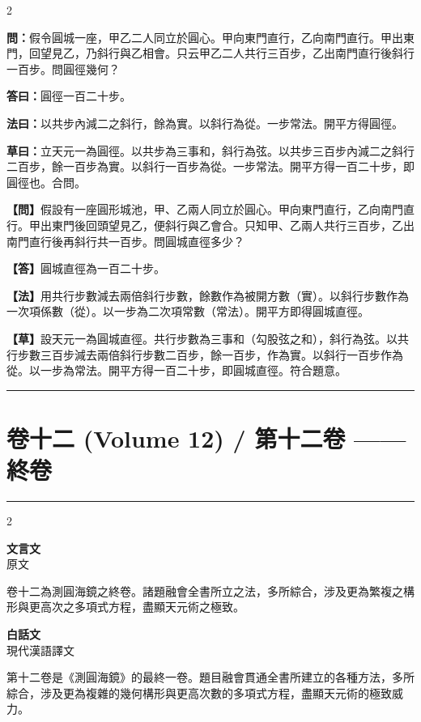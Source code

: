 \documentclass[11pt,a4paper]{article}
\newcommand{\longline}{\noindent\rule{\textwidth}{0.4pt}}
\newcommand{\wenC}[1]{\par\noindent\textbf{\textcolor{probcolor}{問：}}{#1}\par}
\newcommand{\daC}[1]{\par\noindent\textbf{\textcolor{anscolor}{答曰：}}{#1}\par}
\newcommand{\fayueC}[1]{\par\noindent\textbf{\textcolor{methodcolor}{法曰：}}{#1}\par}
\newcommand{\caoyueC}[1]{\par\noindent\textbf{草曰：}{#1}\par}
\newcommand{\wenM}[1]{\par\noindent\textbf{\textcolor{probcolor}{【問】}}{#1}\par}
\newcommand{\daM}[1]{\par\noindent\textbf{\textcolor{anscolor}{【答】}}{#1}\par}
\newcommand{\fayueM}[1]{\par\noindent\textbf{\textcolor{methodcolor}{【法】}}{#1}\par}
\newcommand{\caoyueM}[1]{\par\noindent\textbf{【草】}{#1}\par}
\newcommand{\leftlabel}{\begin{center}\textbf{\large\color{probcolor} 文言文}\\{\small 原文}\end{center}\vspace{0.3cm}}
\newcommand{\rightlabel}{\begin{center}\textbf{\large\color{methodcolor} 白話文}\\{\small 現代漢語譯文}\end{center}\vspace{0.3cm}}
\begin{document}
\begin{paracol}{2}

\wenC{假令圓城一座，甲乙二人同立於圓心。甲向東門直行，乙向南門直行。甲出東門，回望見乙，乃斜行與乙相會。只云甲乙二人共行三百步，乙出南門直行後斜行一百步。問圓徑幾何？}

\daC{圓徑一百二十步。}

\fayueC{以共步內減二之斜行，餘為實。以斜行為從。一步常法。開平方得圓徑。}

\caoyueC{立天元一為圓徑。以共步為三事和，斜行為弦。以共步三百步內減二之斜行二百步，餘一百步為實。以斜行一百步為從。一步常法。開平方得一百二十步，即圓徑也。合問。}

\switchcolumn

\wenM{假設有一座圓形城池，甲、乙兩人同立於圓心。甲向東門直行，乙向南門直行。甲出東門後回頭望見乙，便斜行與乙會合。只知甲、乙兩人共行三百步，乙出南門直行後再斜行共一百步。問圓城直徑多少？}

\daM{圓城直徑為一百二十步。}

\fayueM{用共行步數減去兩倍斜行步數，餘數作為被開方數（實）。以斜行步數作為一次項係數（從）。以一步為二次項常數（常法）。開平方即得圓城直徑。}

\caoyueM{設天元一為圓城直徑。共行步數為三事和（勾股弦之和），斜行為弦。以共行步數三百步減去兩倍斜行步數二百步，餘一百步，作為實。以斜行一百步作為從。以一步為常法。開平方得一百二十步，即圓城直徑。符合題意。}

\end{paracol}

\vspace{0.3cm}
\longline


\newpage
\section{卷十二 (Volume 12) / 第十二卷 —— 終卷}
\label{sec:vol12}

\longline

\begin{paracol}{2}
\leftlabel
卷十二為測圓海鏡之終卷。諸題融會全書所立之法，多所綜合，涉及更為繁複之構形與更高次之多項式方程，盡顯天元術之極致。

\switchcolumn
\rightlabel
第十二卷是《測圓海鏡》的最終一卷。題目融會貫通全書所建立的各種方法，多所綜合，涉及更為複雜的幾何構形與更高次數的多項式方程，盡顯天元術的極致威力。

\end{paracol}
\end{document}
